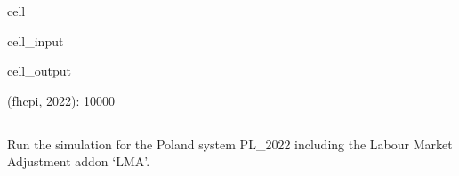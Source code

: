 \documentclass[letterpaper,10pt,english]{sphinxmanual}
\begin{document}
\begin{sphinxuseclass}{cell}
\begin{sphinxuseclass}{cell_input}
\begin{sphinxVerbatim}[commandchars=\\\{\}]
\end{sphinxVerbatim}

\end{sphinxuseclass}
\begin{sphinxuseclass}{cell_output}
\begin{sphinxVerbatim}[commandchars=\\\{\}]
\PYGZob{}(\PYGZsq{}\PYGZdl{}f\PYGZus{}h\PYGZus{}cpi\PYGZsq{}, \PYGZsq{}2022\PYGZsq{}): \PYGZsq{}10000\PYGZsq{}\PYGZcb{}
\end{sphinxVerbatim}

\end{sphinxuseclass}
\end{sphinxuseclass}

\subsection{}
\label{\detokenize{notebooks/example:run-with-add-ons}}
\sphinxAtStartPar
Run the simulation for the Poland system PL\_2022 including the Labour Market Adjustment add\sphinxhyphen{}on ‘LMA’.
\end{document}
